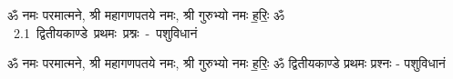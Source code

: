\documentclass[17pt]{extarticle}
\begin{document}
\begin{titlepage}
    \begin{center}
 
\begin{sanskrit}
    { \Large
    ॐ नमः परमात्मने, श्री महागणपतये नमः, श्री गुरुभ्यो नमः
ह॒रिः॒ ॐ 
    }
    \\
    \vspace{2.5cm}
    \mbox{ \Huge
    2.1      द्वितीयकाण्डे  प्रथमः प्रश्नः - पशुविधानं   }
\end{sanskrit}
\end{center}

\end{titlepage}
\tableofcontents

ॐ नमः परमात्मने, श्री महागणपतये नमः, श्री गुरुभ्यो नमः
ह॒रिः॒ ॐ       द्वितीयकाण्डे  प्रथमः प्रश्नः - पशुविधानं \newline

\end{document}

